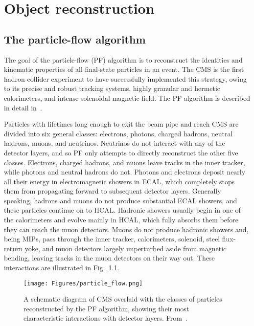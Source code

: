 \chapter{Object reconstruction} \label{chap:reconstruction}
\section{The particle-flow algorithm} \label{sec:reconstruction_particle_flow}
The goal of the particle-flow (PF) algorithm is to reconstruct the identities and kinematic properties of all
final-state particles in an event. The CMS is the first hadron collider experiment to have successfully implemented this strategy,
owing to its precise and robust tracking systems, highly granular and hermetic calorimeters, and intense solenoidal magnetic field.
The PF algorithm is described in detail in~\cite{ref:1748-0221/12/10/P10003}.

Particles with lifetimes long enough to exit the beam pipe and reach CMS are divided into six general classes:
electrons, photons, charged hadrons, neutral hadrons, muons, and neutrinos.
Neutrinos do not interact with any of the detector layers, and so PF only attempts to directly reconstruct the other five classes.
Electrons, charged hadrons, and muons leave tracks in the inner tracker, while photons and neutral hadrons do not. Photons and electrons
deposit nearly all their energy in electromagnetic showers in ECAL, which completely stops them from propagating forward to subsequent
detector layers. Generally speaking, hadrons and muons do not produce substantial ECAL showers, and these particles continue on to HCAL.
Hadronic showers usually begin in one of the calorimeters and evolve mainly in HCAL, which fully absorbs them before they can reach the muon detectors.
Muons do not produce hadronic showers and, being MIPs, pass through the inner tracker, calorimeters, solenoid, steel flux-return yoke,
and muon detectors largely unperturbed aside from magnetic bending, leaving tracks in the muon detectors on their way out.
These interactions are illustrated in Fig.~\ref{fig:particle_flow}.

\begin{figure}[hbtp]
  \begin{center}
    \texttt{[image: Figures/particle\_flow.png]}
    \caption{
    A schematic diagram of CMS overlaid with
    the classes of particles reconstructed by the PF algorithm, showing their most
    characteristic interactions with detector layers.
    From~\cite{ref:1748-0221/12/10/P10003}.
    }
    \label{fig:particle_flow}
  \end{center}
\end{figure}

